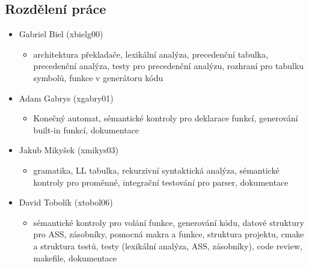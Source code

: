 \documentclass[a4paper, 12pt]{article}
\begin{document}
    \subsection{Rozdělení práce}
        \begin{itemize}
            \item Gabriel Biel (xbielg00)
                \begin{itemize}
                    \item architektura překladače, lexikální analýza, precedenční tabulka, precedenční analýza, testy pro precedenční analýzu, rozhraní pro tabulku symbolů, funkce v generátoru kódu
                \end{itemize}
            \item Adam Gabrys (xgabry01)
                \begin{itemize}
                    \item Konečný automat, sémantické kontroly pro deklarace funkcí, generování built-in funkcí, dokumentace
                \end{itemize}
            \item Jakub Mikyšek (xmikys03)
                \begin{itemize}
                    \item gramatika, LL tabulka, rekurzivní syntaktická analýza, sémantické kontroly pro proměnné, integrační testování pro parser, dokumentace
                \end{itemize}
            \item David Tobolík (xtobol06)
                \begin{itemize}
                    \item sémantické kontroly pro volání funkce, generování kódu, datové struktury pro ASS, zásobníky, pomocná makra a funkce, struktura projektu, cmake a struktura testů, testy (lexikální analýza, ASS, zásobníky), code review, makefile, dokumentace
                \end{itemize}
        \end{itemize}
\end{document}

